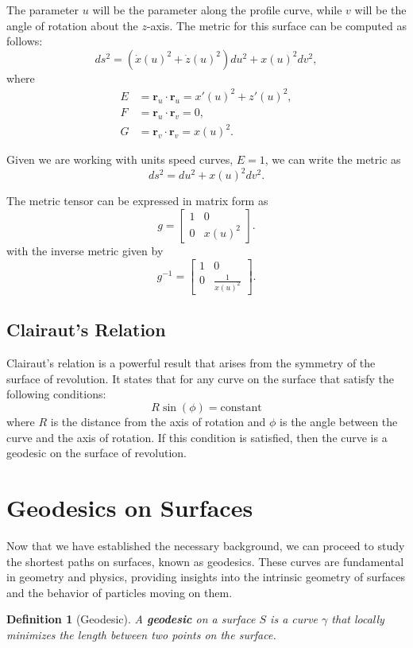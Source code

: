 \documentclass[12pt]{article}
\newtheorem{definition}{Definition}[section]
\begin{document}
The parameter \(u\) will be the parameter along the profile curve, while \(v\) will be the angle of rotation about the \(z\)-axis.
The metric for this surface can be computed as follows:
\[
    ds^{2} = (\dot{x}(u)^{2} + \dot{z}(u)^{2}) du^{2} + x(u)^{2} dv^{2},
\]
where
\begin{align*}
    E &= \mathbf{r}_u \cdot \mathbf{r}_u = x'(u)^2 + z'(u)^2,\\
    F &= \mathbf{r}_u \cdot \mathbf{r}_v = 0,\\
    G &= \mathbf{r}_v \cdot \mathbf{r}_v = x(u)^2.
\end{align*}

Given we are working with units speed curves, $E = 1$, we can write the metric as
\[
    ds^{2} = du^{2} + x(u)^{2} dv^{2}.
\]

The metric tensor can be expressed in matrix form as
\[
    g = \begin{bmatrix} 1 & 0 \\ 0 & x(u)^{2} \end{bmatrix}.
\]
with the inverse metric given by
\[
    g^{-1} = \begin{bmatrix} 1 & 0 \\ 0 & \frac{1}{x(u)^{2}} \end{bmatrix}.
\]

\subsection{Clairaut’s Relation}
Clairaut's relation is a powerful result that arises from the symmetry of the surface of revolution.
It states that for any curve on the surface that satisfy the following conditions:
\[
    R \sin(\phi) = \text{constant}
\]
where \(R\) is the distance from the axis of rotation and \(\phi\) is the angle between the curve and the axis of rotation.
If this condition is satisfied, then the curve is a geodesic on the surface of revolution.

\section{Geodesics on Surfaces}

Now that we have established the necessary background, we can proceed to study the shortest paths on surfaces, known as geodesics.
These curves are fundamental in geometry and physics, providing insights into the intrinsic geometry of surfaces and the behavior of particles moving on them.

\begin{definition}[Geodesic]
    A \textbf{geodesic} on a surface $S$ is a curve $\gamma$ that locally minimizes the length between two points on the surface.
\end{definition}
\end{document}
